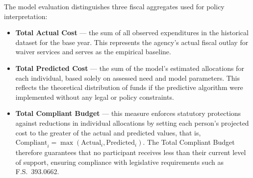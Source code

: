 The model evaluation distinguishes three fiscal aggregates used for policy interpretation: 
\begin{itemize}
    \item \textbf{Total Actual Cost} --- the sum of all observed expenditures in the historical dataset for the base year.  This represents the agency's actual fiscal outlay for waiver services and serves as the empirical baseline.  
    \item \textbf{Total Predicted Cost} --- the sum of the model's estimated allocations for each individual, based solely on assessed need and model parameters.  This reflects the theoretical distribution of funds if the predictive algorithm were implemented without any legal or policy constraints.  
    \item \textbf{Total Compliant Budget} --- this measure enforces statutory protections against reductions in individual allocations by setting each person's projected cost to the greater of the actual and predicted values, that is, 
    $\text{Compliant}_i = \max(\text{Actual}_i, \text{Predicted}_i)$.  
    The Total Compliant Budget therefore guarantees that no participant receives less than their current level of support, ensuring compliance with legislative requirements such as F.S.~393.0662.  
\end{itemize}



